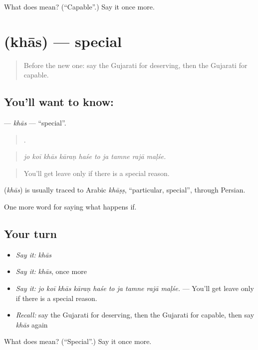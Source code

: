 \begin{tcolorbox}[breakable,colback=teal!4,colframe=teal!35!black,title={Before you move on}]
What does  mean? (\textquotedblleft{}Capable\textquotedblright{}.) Say it once more.
\end{tcolorbox}
\section[\texorpdfstring{\gu{ખાસ} (khās)}{ખાસ (khās)}]{ (khās) — special}

\label{lesson:GU-C543-khas}



\begin{quote}
Before the new one: say the Gujarati for deserving, then the Gujarati for capable.
\end{quote}

\subsection*{You'll want to know: }
\textbf{} — \emph{khās} — \textquotedblleft{}special\textquotedblright{}.

\begin{quote}
         .
\end{quote}

\begin{quote}
\emph{jo koī khās kāraṇ haśe to ja tamne rajā maḷśe.}
\end{quote}

\begin{quote}
You'll get leave only if there is a special reason.
\end{quote}

\begin{cousinweb}
\textbf{} (\emph{khās}) is usually traced to Arabic \emph{khāṣṣ}, \textquotedblleft{}particular, special\textquotedblright{}, through Persian.
\end{cousinweb}

\begin{grammarlens}[title={What you've built}]
One more word for saying what happens if.
\end{grammarlens}

\subsection*{Your turn}
\begin{itemize}
\raggedright
  \item \emph{Say it:} \emph{khās}
  \item \emph{Say it:} \emph{khās}, once more
  \item \emph{Say it:} \emph{jo koī khās kāraṇ haśe to ja tamne rajā maḷśe.} — You'll get leave only if there is a special reason.
  \item \emph{Recall:} say the Gujarati for deserving, then the Gujarati for capable, then say \emph{khās} again
\end{itemize}

\begin{tcolorbox}[breakable,colback=teal!4,colframe=teal!35!black,title={Before you move on}]
What does  mean? (\textquotedblleft{}Special\textquotedblright{}.) Say it once more.
\end{tcolorbox}
